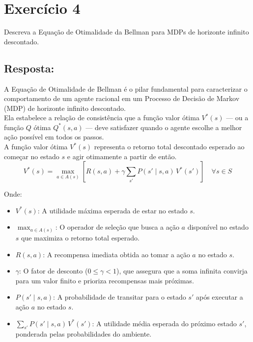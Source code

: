 \documentclass[a4paper,12pt]{article}
\begin{document}
\section*{Exercício 4}

Descreva a Equação de Otimalidade da Bellman para MDPs de horizonte infinito descontado.


\subsection*{Resposta:}

\bigskip

A Equação de Otimalidade de Bellman é o pilar fundamental para caracterizar o comportamento de um agente racional em um Processo de Decisão de Markov (MDP) de horizonte infinito descontado.\\

Ela estabelece a relação de consistência que a função valor ótima $V^*(s)$ — ou a função $Q$ ótima $Q^*(s,a)$ — deve satisfazer quando o agente escolhe a melhor ação possível em todos os passos.\\

A função valor ótima $V^*(s)$ representa o retorno total descontado esperado ao começar no estado $s$ e agir otimamente a partir de então.\\

$$V^*(s) = \max_{a \in A(s)} \left[ R(s, a) + \gamma \sum_{s'} P(s' \mid s, a) \, V^*(s') \right] \quad \forall s \in S$$

Onde:
\begin{itemize}
	\item $V^*(s)$: A utilidade máxima esperada de estar no estado $s$.
	\item $\max_{a \in A(s)}$: O operador de seleção que busca a ação $a$ disponível no estado $s$ que maximiza o retorno total esperado.
	\item $R(s, a)$: A recompensa imediata obtida ao tomar a ação $a$ no estado $s$.
	\item $\gamma$: O fator de desconto ($0 \le \gamma < 1$), que assegura que a soma infinita convirja para um valor finito e prioriza recompensas mais próximas.
	\item $P(s' \mid s, a)$: A probabilidade de transitar para o estado $s'$ após executar a ação $a$ no estado $s$.
	\item $\sum_{s'} P(s' \mid s, a) \, V^*(s')$: A utilidade média esperada do próximo estado $s'$, ponderada pelas probabilidades do ambiente.
\end{itemize}
\end{document}

